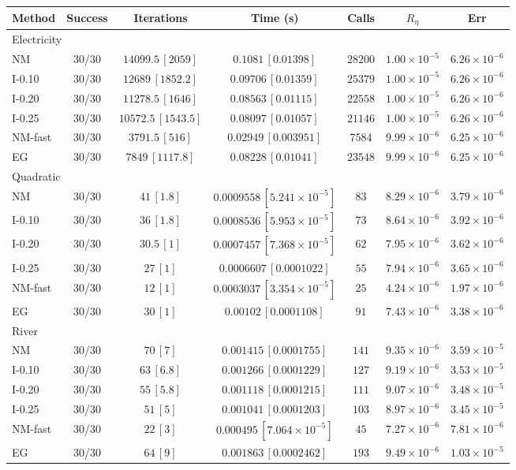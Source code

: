 \begin{tabular}{lcccccc}
\toprule
Method & Success & Iterations & Time (s) & Calls & $R_\eta$ & Err \\
\midrule
\multicolumn{7}{l}{Electricity} \\
NM & 30/30 & $14099.5\, [2059]$ & $0.1081\, [0.01398]$ & $28200$ & $1.00\times10^{-5}$ & $6.26\times10^{-6}$ \\
I-0.10 & 30/30 & $12689\, [1852.2]$ & $0.09706\, [0.01359]$ & $25379$ & $1.00\times10^{-5}$ & $6.26\times10^{-6}$ \\
I-0.20 & 30/30 & $11278.5\, [1646]$ & $0.08563\, [0.01115]$ & $22558$ & $1.00\times10^{-5}$ & $6.26\times10^{-6}$ \\
I-0.25 & 30/30 & $10572.5\, [1543.5]$ & $0.08097\, [0.01057]$ & $21146$ & $1.00\times10^{-5}$ & $6.26\times10^{-6}$ \\
NM-fast & 30/30 & $3791.5\, [516]$ & $0.02949\, [0.003951]$ & $7584$ & $9.99\times10^{-6}$ & $6.25\times10^{-6}$ \\
EG & 30/30 & $7849\, [1117.8]$ & $0.08228\, [0.01041]$ & $23548$ & $9.99\times10^{-6}$ & $6.25\times10^{-6}$ \\
\midrule
\multicolumn{7}{l}{Quadratic} \\
NM & 30/30 & $41\, [1.8]$ & $0.0009558\, [5.241\times10^{-5}]$ & $83$ & $8.29\times10^{-6}$ & $3.79\times10^{-6}$ \\
I-0.10 & 30/30 & $36\, [1.8]$ & $0.0008536\, [5.953\times10^{-5}]$ & $73$ & $8.64\times10^{-6}$ & $3.92\times10^{-6}$ \\
I-0.20 & 30/30 & $30.5\, [1]$ & $0.0007457\, [7.368\times10^{-5}]$ & $62$ & $7.95\times10^{-6}$ & $3.62\times10^{-6}$ \\
I-0.25 & 30/30 & $27\, [1]$ & $0.0006607\, [0.0001022]$ & $55$ & $7.94\times10^{-6}$ & $3.65\times10^{-6}$ \\
NM-fast & 30/30 & $12\, [1]$ & $0.0003037\, [3.354\times10^{-5}]$ & $25$ & $4.24\times10^{-6}$ & $1.97\times10^{-6}$ \\
EG & 30/30 & $30\, [1]$ & $0.00102\, [0.0001108]$ & $91$ & $7.43\times10^{-6}$ & $3.38\times10^{-6}$ \\
\midrule
\multicolumn{7}{l}{River} \\
NM & 30/30 & $70\, [7]$ & $0.001415\, [0.0001755]$ & $141$ & $9.35\times10^{-6}$ & $3.59\times10^{-5}$ \\
I-0.10 & 30/30 & $63\, [6.8]$ & $0.001266\, [0.0001229]$ & $127$ & $9.19\times10^{-6}$ & $3.53\times10^{-5}$ \\
I-0.20 & 30/30 & $55\, [5.8]$ & $0.001118\, [0.0001215]$ & $111$ & $9.07\times10^{-6}$ & $3.48\times10^{-5}$ \\
I-0.25 & 30/30 & $51\, [5]$ & $0.001041\, [0.0001203]$ & $103$ & $8.97\times10^{-6}$ & $3.45\times10^{-5}$ \\
NM-fast & 30/30 & $22\, [3]$ & $0.000495\, [7.064\times10^{-5}]$ & $45$ & $7.27\times10^{-6}$ & $7.81\times10^{-6}$ \\
EG & 30/30 & $64\, [9]$ & $0.001863\, [0.0002462]$ & $193$ & $9.49\times10^{-6}$ & $1.03\times10^{-5}$ \\
\bottomrule
\end{tabular}
